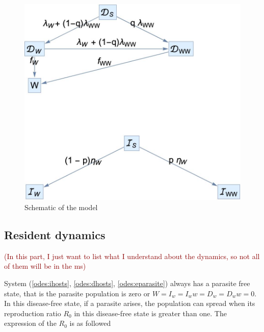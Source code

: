 \documentclass{article}
\newcommand{\phg}[1]{\textcolor{darkred}{(#1)}}
\begin{document}
\begin{figure}
\includegraphics[width=\textwidth]{schematic}
\caption{Schematic of the model}
\label{fig:schematic}
\end{figure}

\subsection{Resident dynamics}

\phg{In this part, I just want to list what I understand about the dynamics, so not all of them will be in the ms}

System (\ref{odes:ihosts}, \ref{odes:dhosts}, \ref{odes:eparasite}) always has a parasite free state, that is the parasite population is zero or $W = I_w = I_ww = D_w = D_ww = 0$. In this disease-free state, if a parasite arises, the population can spread when its reproduction ratio $R_0$ in this disease-free state is greater than one. The expression of the $R_0$ is as followed
\end{document}
